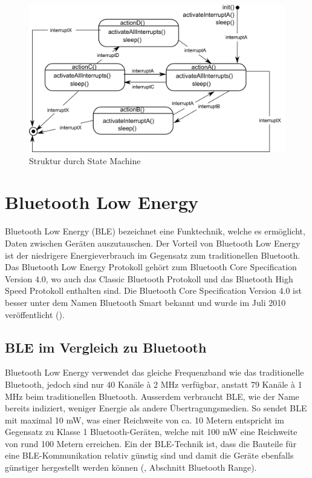 \begin{figure}[ht]
    \includegraphics[width=1.0\textwidth]{2TheoretischeGrundlagen/imag/StateMachineGrundlage.png}
    \caption{Struktur durch State Machine}
    \label{t_stateMachine} 
\end{figure}

\section{Bluetooth Low Energy}\label{t_ble} 

Bluetooth Low Energy (BLE) bezeichnet eine Funktechnik, welche es ermöglicht, Daten zwischen Geräten auszutauschen. Der Vorteil von Bluetooth Low Energy ist der niedrigere Energieverbrauch im Gegensatz zum traditionellen Bluetooth. Das Bluetooth Low Energy Protokoll gehört zum Bluetooth Core Specification Version 4.0, wo auch das Classic Bluetooth Protokoll und das Bluetooth High Speed Protokoll enthalten sind. Die Bluetooth Core Specification Version 4.0 ist besser unter dem Namen Bluetooth Smart bekannt und wurde im Juli 2010 veröffentlicht (\cite{youtube_BLE}).

\subsection{BLE im Vergleich zu Bluetooth}
  
Bluetooth Low Energy verwendet das gleiche Frequenzband wie das traditionelle Bluetooth, jedoch sind nur 40 Kanäle à 2 MHz verfügbar, anstatt 79 Kanäle à 1 MHz beim traditionellen Bluetooth. Ausserdem verbraucht BLE, wie der Name bereits indiziert, weniger Energie als andere Übertragungsmedien. So sendet BLE mit maximal 10 mW, was einer Reichweite von ca. 10 Metern entspricht im Gegensatz zu Klasse 1 Bluetooth-Geräten, welche mit 100 mW eine Reichweite von rund 100 Metern erreichen. Ein der BLE-Technik ist, dass die Bauteile für eine BLE-Kommunikation relativ günstig sind und damit die Geräte ebenfalls günstiger hergestellt werden können (\cite{Interent_BLE}, Abschnitt Bluetooth Range).

